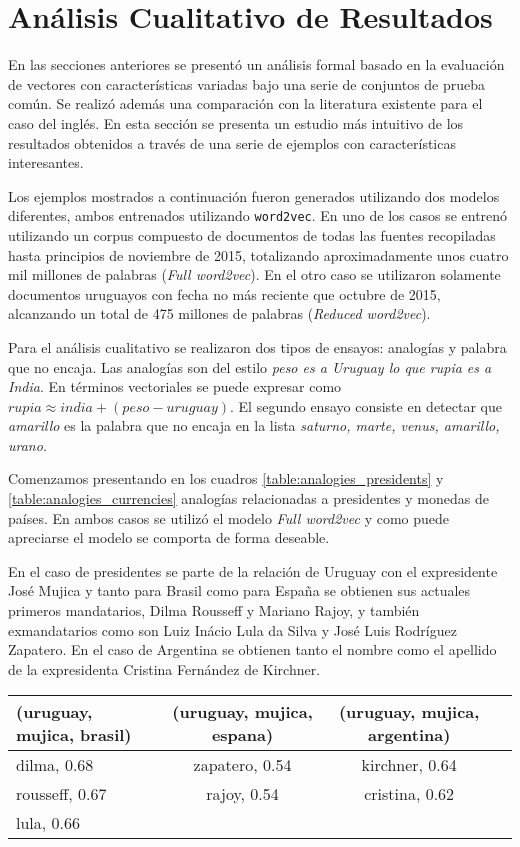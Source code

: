 \section{Análisis Cualitativo de Resultados}

En las secciones anteriores se presentó un análisis formal basado en la evaluación de vectores con
características variadas bajo una serie de conjuntos de prueba común. Se realizó además
una comparación con la literatura existente para el caso del inglés. En esta sección se presenta
un estudio más intuitivo de los resultados obtenidos a través de una serie de ejemplos con
características interesantes.

Los ejemplos mostrados a continuación fueron generados utilizando dos modelos diferentes, ambos
entrenados utilizando \texttt{word2vec}. En uno de los casos se entrenó utilizando un corpus
compuesto de documentos de todas las fuentes recopiladas hasta principios de noviembre de 2015,
totalizando aproximadamente unos cuatro mil millones de palabras (\textit{Full word2vec}). En el
otro caso se utilizaron solamente documentos uruguayos con fecha no más reciente que octubre de
2015, alcanzando un total de 475 millones de palabras (\textit{Reduced word2vec}).

Para el análisis cualitativo se realizaron dos tipos de ensayos: analogías y palabra que no encaja. Las
analogías son del estilo \textit{peso es a Uruguay lo que rupia es a India}. En términos vectoriales
se puede expresar como $rupia \approx india + (peso - uruguay)$. El segundo ensayo consiste en
detectar que \textit{amarillo} es la palabra que no encaja en la lista \textit{saturno, marte, venus,
amarillo, urano}.

Comenzamos presentando en los cuadros \ref{table:analogies_presidents} y
\ref{table:analogies_currencies} analogías relacionadas a presidentes y monedas de países. En ambos
casos se utilizó el modelo \textit{Full word2vec} y como puede apreciarse el modelo se comporta de
forma deseable.

En el caso de presidentes se parte de la relación de Uruguay con el expresidente José Mujica y tanto
para Brasil como para España se obtienen sus actuales primeros mandatarios, Dilma Rousseff y
Mariano Rajoy, y también exmandatarios como son Luiz Inácio Lula da Silva y José Luis Rodríguez
Zapatero. En el caso de Argentina se obtienen tanto el nombre como el apellido de la expresidenta
Cristina Fernández de Kirchner.

\begin{table*}[ht]
    \centering
    \begin{tabular}{lccc}
        \hline
        (uruguay, mujica, brasil) & (uruguay, mujica, espana) & (uruguay, mujica, argentina)\\
        \hline
        dilma, 0.68 & zapatero, 0.54 & kirchner, 0.64\\
        rousseff, 0.67 & rajoy, 0.54 & cristina, 0.62\\
        lula, 0.66\\
        \hline
    \end{tabular}
    \caption{Analogías para países y presidentes.}
    \label{table:analogies_presidents}
\end{table*}

